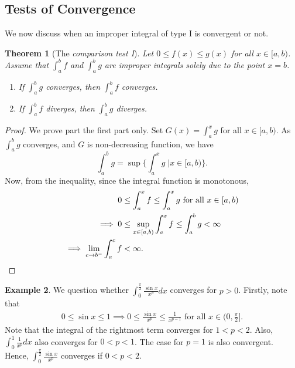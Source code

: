 \documentclass[15pt,a4paper]{book}
\newtheorem{theorem}{Theorem}[chapter]
\theoremstyle{definition}
\newtheorem{example}[theorem]{Example}
\newcommand{\eax}[1]{\emph{#1}\index{#1}} %
\begin{document}
\subsection{Tests of Convergence}
We now discuss when an improper integral of type I is convergent or not.
\begin{theorem}[The \eax{comparison test I}]
    Let $0 \leq f(x) \leq g(x)$ for all $x \in [a,b)$. Assume that $\int_{a}^{b} f$ and $\int_{a}^{b} g$ are improper integrals solely due to the point $x = b$.
    \begin{enumerate}
        \item If $\int_{a}^{b} g$ converges, then $\int_{a}^{b} f$ converges.
        \item If $\int_{a}^{b} f$ diverges, then $\int_{a}^{b} g$ diverges.
    \end{enumerate}
\end{theorem}
\begin{proof}
    We prove part the first part only. Set $G(x) = \int_{a}^{x} g$ for all $x \in [a,b)$. As $\int_{a}^{b} g$ converges, and $G$ is non-decreasing function, we have
    \begin{equation*}
        \int_{a}^{b} g = \sup \{\int_{a}^{x} g \; | x \in [a,b) \}.
    \end{equation*}
    Now, from the inequality, since the integral function is monotonous,
    \begin{align}
        0 &\leq \int_{a}^{x} f \leq \int_{a}^{x} g \text{ for all } x \in [a,b) \notag \\
        \implies 0 &\leq \sup_{x \in [a,b)} \int_{a}^{x} f \leq \int_{a}^{b} g < \infty \\
        \implies \lim_{c \to b^{-}} \int_{a}^{c} f &< \infty.
    \end{align}
\end{proof}

\begin{example}
    We question whether $\int_{0}^{\frac{\pi}{2}} \frac{\sin x}{x^{p}} dx$ converges for $p > 0$. Firstly, note that
    \begin{align*}
        0 \leq \sin x \leq 1 \implies 0 \leq \frac{\sin x}{x^{p}} \leq \frac{1}{x^{p-1}} \text{ for all } x \in (0, \frac{\pi}{2}].
    \end{align*}
    Note that the integral of the rightmost term converges for $1 < p < 2$. Also, $\int_{0}^{1} \frac{1}{x^{p}} dx$ also converges for $0 < p < 1$. The case for $p = 1$ is also convergent. Hence, $\int_{0}^{\frac{\pi}{2}} \frac{\sin x}{x^{p}}$ converges if $0 < p < 2$.
\end{example}
\end{document}
